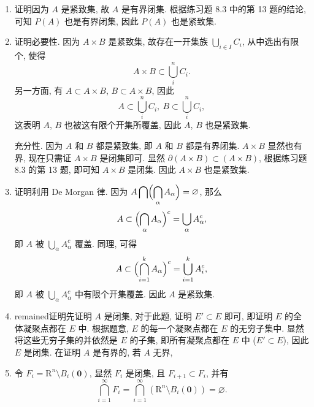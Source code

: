 % 
\begin{enumerate}
    \item %
        {\heiti 证明}\quad 因为 $A$ 是紧致集, 故 $A$ 是有界闭集. 根据练习题 8.3 中的第 13 题的结论,
        可知 $P(A)$ 也是有界闭集, 因此 $P(A)$ 也是紧致集.
    \item %
        {\heiti 证明}\quad 必要性. 因为 $A \times B$ 是紧致集, 故存在一开集族 $\bigcup_{i \in I}C_i$, 从中选出有限个, 使得
        \[
            A \times B \subset \bigcup_{i}^{n}C_i.    
        \]
        另一方面, 有 $A \subset A \times B$, $B \subset A \times B$, 因此
        \[
            A \subset \bigcup_{i}^{n}C_i,\ B \subset \bigcup_{i}^{n}C_i,   
        \]
        这表明 $A$, $B$ 也被这有限个开集所覆盖, 因此 $A$, $B$ 也是紧致集.

        充分性. 因为 $A$ 和 $B$ 都是紧致集, 即 $A$ 和 $B$ 都是有界闭集. $A \times B$ 显然也有界, 现在只需证 $A \times B$ 是闭集即可.
        显然 $\partial(A \times B) \subset (A \times B)$, 根据练习题 8.3 的第 13 题, 即可知 $A \times B$ 是闭集. 因此 $A \times B$ 也是紧致集.
    \item %
        {\heiti 证明}\quad 利用 De Morgan 律. 因为 $\displaystyle{A \bigcap \Bigl(\bigcap_{\alpha}A_\alpha\Bigr) = \varnothing}$, 那么
        \[
            A \subset \Bigl(\bigcap_{\alpha}A_\alpha\Bigr)^c = \bigcup_{\alpha}A_\alpha^c,
        \]
        即 $A$ 被 $\displaystyle{\bigcup_{\alpha}A_\alpha^c}$ 覆盖. 同理, 可得
        \[
            A \subset \Bigl(\bigcap_{i=1}^kA_\alpha\Bigr)^c =  \bigcup_{i=1}^kA_i^c,   
        \]
        即 $A$ 被 $\displaystyle{\bigcup_{\alpha}A_\alpha^c}$ 中有限个开集覆盖. 因此 $A$ 是紧致集.
    \item %
        {\heiti\color{red} remained}{\heiti 证明}\quad 先证明 $A$ 是闭集, 对于此题, 证明 $E' \subset E$ 即可, 即证明 $E$ 的全体凝聚点都在 $E$ 中.
        根据题意, $E$ 的每一个凝聚点都在 $E$ 的无穷子集中. 显然将这些无穷子集的并依然是 $E$ 的子集, 即所有凝聚点都在 $E$ 中 ($E' \subset E$), 因此 $E$ 是闭集.
        在证明 $A$ 是有界的, 若 $A$ 无界, 
    \item %
        令 $F_i = \mathrm{R}^n \setminus B_i(\boldsymbol{0})$, 显然 $F_i$ 是闭集, 且 $F_{i+1} \subset F_i$, 并有
        \[
            \bigcap_{i=1}^{\infty}F_i = \bigcap_{i=1}^{\infty}\left(\mathrm{R}^n \setminus B_i(\boldsymbol{0})\right) = \varnothing.    
        \]
        

\end{enumerate}
